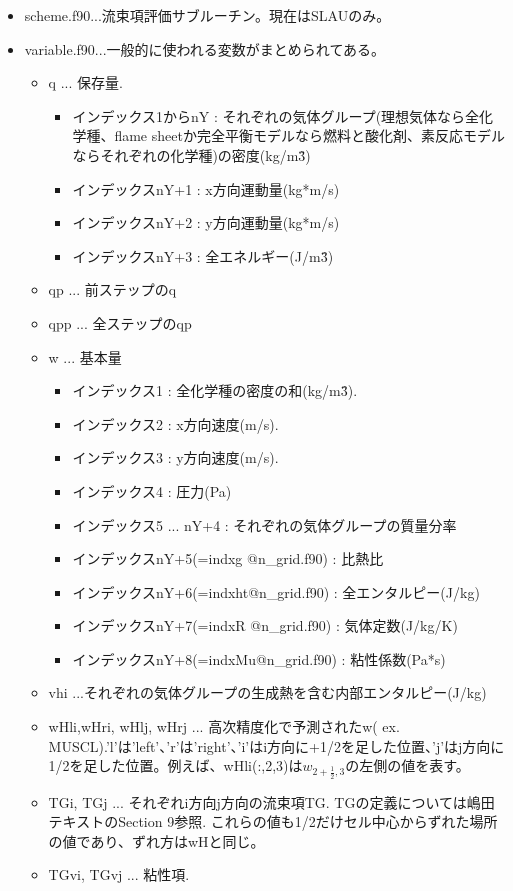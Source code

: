 \documentclass{jsarticle}
\begin{document}
\begin{itemize}
\item scheme.f90...流束項評価サブルーチン。現在はSLAUのみ。
\item variable.f90...一般的に使われる変数がまとめられてある。
\begin{itemize}
\item q ... 保存量.
\begin{itemize}
\item インデックス1からnY : それぞれの気体グループ(理想気体なら全化学種、flame sheetか完全平衡モデルなら燃料と酸化剤、素反応モデルならそれぞれの化学種)の密度(kg/m\^3)
\item インデックスnY+1 : x方向運動量(kg*m/s)
\item インデックスnY+2 : y方向運動量(kg*m/s)
\item インデックスnY+3 : 全エネルギー(J/m\^3)
\end{itemize}
\item qp ... 前ステップのq
\item qpp ... 全ステップのqp
\item w ... 基本量
\begin{itemize}
\item インデックス1 : 全化学種の密度の和(kg/m\^3).
\item インデックス2 : x方向速度(m/s).
\item インデックス3 : y方向速度(m/s).
\item インデックス4 : 圧力(Pa)
\item インデックス5 ... nY+4 : それぞれの気体グループの質量分率
\item インデックスnY+5(=indxg @n\_grid.f90) : 比熱比
\item インデックスnY+6(=indxht@n\_grid.f90) : 全エンタルピー(J/kg)
\item インデックスnY+7(=indxR @n\_grid.f90) : 気体定数(J/kg/K)
\item インデックスnY+8(=indxMu@n\_grid.f90) : 粘性係数(Pa*s)
\end{itemize}
\item vhi ...それぞれの気体グループの生成熱を含む内部エンタルピー(J/kg)
\item wHli,wHri, wHlj, wHrj ... 高次精度化で予測されたw( ex. MUSCL).'l'は'left'、'r'は'right'、'i'はi方向に+1/2を足した位置、'j'はj方向に1/2を足した位置。例えば、wHli(:,2,3)は$w_{2+\frac 1 2,3}$の左側の値を表す。
\item TGi, TGj ... それぞれi方向j方向の流束項TG. TGの定義については嶋田テキストのSection 9参照. 
これらの値も1/2だけセル中心からずれた場所の値であり、ずれ方はwHと同じ。
\item TGvi, TGvj ... 粘性項.

\end{itemize}
\end{itemize}
\end{document}
